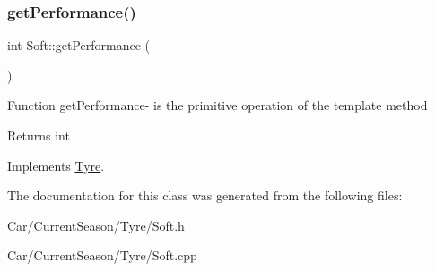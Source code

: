 \subsubsection{\texorpdfstring{get\+Performance()}{getPerformance()}}
{\footnotesize\ttfamily int Soft\+::get\+Performance (\begin{DoxyParamCaption}{ }\end{DoxyParamCaption})\hspace{0.3cm}{\ttfamily [virtual]}}

Function get\+Performance-\/ is the primitive operation of the template method \begin{DoxyReturn}{Returns}
int 
\end{DoxyReturn}


Implements \hyperlink{classTyre_a039a0e53d35fb8bb9301e05b13af1478}{Tyre}.



The documentation for this class was generated from the following files\+:\begin{DoxyCompactItemize}
\item 
Car/\+Current\+Season/\+Tyre/Soft.\+h\item 
Car/\+Current\+Season/\+Tyre/Soft.\+cpp\end{DoxyCompactItemize}
